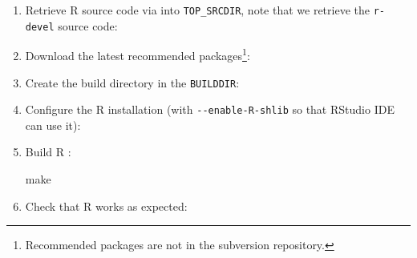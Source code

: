 \documentclass[
]{book}
\newenvironment{Shaded}{\begin{snugshade}}{\end{snugshade}}
\newcommand{\AttributeTok}[1]{\textcolor[rgb]{0.77,0.63,0.00}{#1}}
\newcommand{\BuiltInTok}[1]{#1}
\newcommand{\FunctionTok}[1]{\textcolor[rgb]{0.00,0.00,0.00}{#1}}
\newcommand{\NormalTok}[1]{#1}
\newcommand{\OperatorTok}[1]{\textcolor[rgb]{0.81,0.36,0.00}{\textbf{#1}}}
\newcommand{\StringTok}[1]{\textcolor[rgb]{0.31,0.60,0.02}{#1}}
\newcommand{\VariableTok}[1]{\textcolor[rgb]{0.00,0.00,0.00}{#1}}
\begin{document}
\begin{enumerate}
\def\labelenumi{\arabic{enumi}.}
\setcounter{enumi}{-1}
\item
  Retrieve R source code via into \texttt{TOP\_SRCDIR}, note that we retrieve the \texttt{r-devel} source code:

\begin{Shaded}
\end{Shaded}
\item
  Download the latest recommended packages\footnote{Recommended packages are not in the subversion repository.}:

\begin{Shaded}
\end{Shaded}
\item
  Create the build directory in the \texttt{BUILDDIR}:

\begin{Shaded}
\end{Shaded}
\item
  Configure the R installation (with \texttt{-\/-enable-R-shlib} so that RStudio IDE can use it):

\begin{Shaded}
\end{Shaded}
\item
  Build R :

\begin{Shaded}
\begin{Highlighting}[]
\FunctionTok{make}
\end{Highlighting}
\end{Shaded}
\item
  Check that R works as expected:


\end{enumerate}
\end{document}
